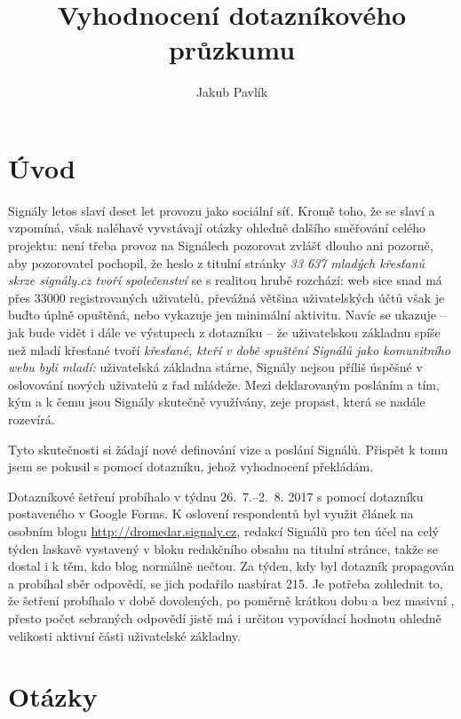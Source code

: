 \documentclass[12pt, a4paper, twoside]{article}
\author{Jakub Pavlík}
\title{Vyhodnocení dotazníkového průzkumu \uv{signaly.cz z pohledu uživatelů}}
\begin{document}
\setlength{\parindent}{0.5cm}

\maketitle

\section*{Úvod}

Signály letos slaví deset let provozu jako sociální síť.
Kromě toho, že se slaví a vzpomíná, však naléhavě vyvstávají otázky
ohledně dalšího směřování celého projektu:
není třeba provoz na Signálech pozorovat zvlášť dlouho ani pozorně,
aby pozorovatel pochopil, že heslo z titulní stránky
\emph{33 637 mladých křesťanů skrze signály.cz tvoří společenství}
se s realitou hrubě rozchází:
web sice snad má přes 33000 registrovaných
uživatelů, převážná většina uživatelských účtů však je buďto
úplně opuštěná, nebo vykazuje jen minimální aktivitu.
Navíc se ukazuje -- jak bude vidět i dále ve výstupech z dotazníku --
že uživatelskou základnu spíše než mladí křesťané
tvoří \emph{křesťané, kteří v době spuštění Signálů jako komunitního
  webu byli mladí:}
uživatelská základna stárne, Signály nejsou příliš úspěšné
v oslovování nových uživatelů z řad mládeže.
Mezi deklarovaným posláním a tím, kým a k čemu jsou Signály skutečně
využívány, zeje propast, která se nadále rozevírá.

Tyto skutečnosti si žádají nové definování vize a poslání Signálů.
Přispět k tomu jsem se pokusil s pomocí dotazníku, jehož vyhodnocení
překládám.

Dotazníkové šetření probíhalo v týdnu 26.~7.--2.~8. 2017
s pomocí dotazníku postaveného v Google Forms.
K oslovení respondentů byl využit článek na osobním blogu
\url{http://dromedar.signaly.cz}, redakcí Signálů pro ten účel
na celý týden laskavě vystavený v bloku redakčního obsahu
na titulní stránce, takže se dostal i k těm, kdo blog normálně
nečtou.
Za týden, kdy byl dotazník propagován a probíhal sběr odpovědí,
se jich podařilo nasbírat 215. Je potřeba zohlednit to, že
šetření probíhalo v době dovolených, po poměrně krátkou dobu
a bez masivní ,
přesto počet sebraných odpovědí jistě má i určitou vypovídací
hodnotu ohledně velikosti aktivní části uživatelské základny.

\section{Otázky}
\end{document}
